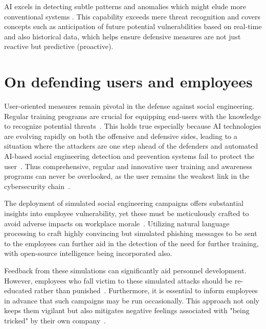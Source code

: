 AI excels in detecting subtle patterns and anomalies which might elude more conventional systems \citep{fakhouri_AI_Driven_Solutions_SE_Attacks_2024}. This capability exceeds mere threat recognition and covers concepts such as anticipation of future potential vulnerabilities based on real-time and also historical data, which helps ensure defensive measures are not just reactive but predictive (proactive).

\section{On defending users and employees}
\begin{comment}
\end{comment}

User-oriented measures remain pivotal in the defense against social engineering. Regular training programs are crucial for equipping end-users with the knowledge to recognize potential threats~\citep{hadnagy_Social_Engineering_The_Science_2018}. This holds true especially because AI technologies are evolving rapidly on both the offensive and defensive sides, leading to a situation where the attackers are one step ahead of the defenders and automated AI-based social engineering detection and prevention systems fail to protect the user~\citep{fakhouri_AI_Driven_Solutions_SE_Attacks_2024}. Thus comprehensive, regular and innovative user training and awareness programs can never be overlooked, as the user remains the weakest link in the cybersecurity chain~\citep{mitnick_The_Art_of_Deception_2003}.

The deployment of simulated social engineering campaigns offers substantial insights into employee vulnerability, yet these must be meticulously crafted to avoid adverse impacts on workplace morale~\citep{mitnick_The_Art_of_Deception_2003}. Utilizing natural language processing to craft highly convincing but simulated phishing messages to be sent to the employees can further aid in the detection of the need for further training, with open-source intelligence being incorporated also.

Feedback from these simulations can significantly aid personnel development. However, employees who fall victim to these simulated attacks should be re-educated rather than punished~\citep{mitnick_The_Art_of_Deception_2003}. Furthermore, it is essential to inform employees in advance that such campaigns may be run occasionally. This approach not only keeps them vigilant but also mitigates negative feelings associated with "being tricked" by their own company~\citep{hadnagy_Social_Engineering_The_Science_2018}. 

